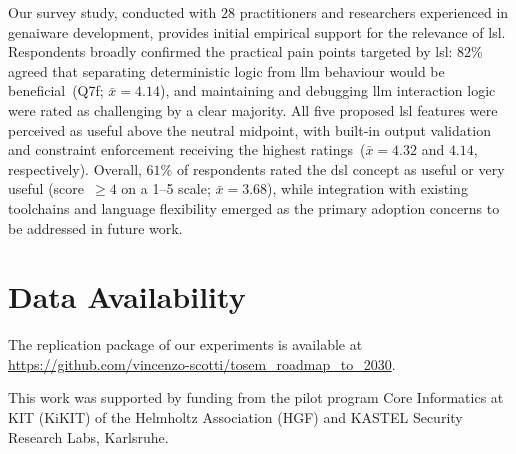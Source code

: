 \documentclass[manuscript,screen]{acmart}
\begin{document}
Our survey study, conducted with $28$ practitioners and researchers experienced in \ac{genai}ware development, provides initial empirical support for the relevance of \ac{lsl}.
Respondents broadly confirmed the practical pain points targeted by \ac{lsl}: $82\%$ agreed that separating deterministic logic from \ac{llm} behaviour would be beneficial~(Q7f; $\bar{x} = 4.14$), and maintaining and debugging \ac{llm} interaction logic were rated as challenging by a clear majority.
All five proposed \ac{lsl} features were perceived as useful above the neutral midpoint, with built-in output validation and constraint enforcement receiving the highest ratings~($\bar{x} = 4.32$ and $4.14$, respectively).
Overall, $61\%$ of respondents rated the \ac{dsl} concept as useful or very useful (score~$\geq 4$ on a 1--5 scale; $\bar{x} = 3.68$), while integration with existing toolchains and language flexibility emerged as the primary adoption concerns to be addressed in future work.



\section*{Data Availability}

The replication package of our experiments is available at \url{https://github.com/vincenzo-scotti/tosem_roadmap_to_2030}.

\begin{acks}
This work was supported by funding from the pilot program Core Informatics at KIT (KiKIT) of the Helmholtz Association (HGF) and KASTEL Security Research Labs, Karlsruhe.
\end{acks}

\end{document}
